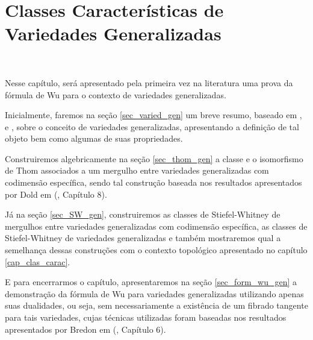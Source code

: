 \documentclass[12pt,oneside]{book} %
\begin{document}
\chapter{Classes Características de Variedades Generalizadas}\label{cap_wu_gen}
\thispagestyle{empty}

\

\par Nesse capítulo, será apresentado pela primeira vez na literatura uma prova da fórmula de Wu para o contexto de variedades generalizadas.

\par Inicialmente, faremos na seção \ref{sec_varied_gen} um breve resumo, baseado em \cite{biasi}, \cite{denise} e \cite{bredon_2}, sobre o conceito de variedades generalizadas, apresentando a definição de tal objeto bem como algumas de suas propriedades.

\par Construiremos algebricamente na seção \ref{sec_thom_gen} a classe e o isomorfismo de Thom associados a um mergulho entre variedades generalizadas com codimensão específica, sendo tal construção baseada nos resultados apresentados por Dold em (\cite{dold}, Capítulo 8).

\par Já na seção \ref{sec_SW_gen}, construiremos as classes de Stiefel-Whitney de mergulhos entre variedades generalizadas com codimensão específica, as classes de Stiefel-Whitney de variedades generalizadas e também mostraremos qual a semelhança dessas construções com o contexto topológico apresentado no capítulo \ref{cap_clas_carac}.

\par E para encerrarmos o capítulo, apresentaremos na seção \ref{sec_form_wu_gen} a demonstração da fórmula de Wu para variedades generalizadas utilizando apenas suas dualidades, ou seja, sem necessariamente a existência de um fibrado tangente para tais variedades, cujas técnicas utilizadas foram baseadas nos resultados apresentados por Bredon em (\cite{bredon}, Capítulo 6).



\end{document}
